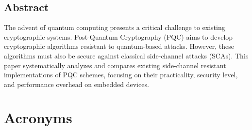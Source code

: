 \documentclass[a4paper,12pt,twoside,openany,headsepline,bibliography=totocnumbered]{scrbook}
\begin{document}


\section*{Abstract}
The advent of quantum computing presents a critical challenge to existing cryptographic systems. Post-Quantum Cryptography (PQC) aims to develop cryptographic algorithms resistant to quantum-based attacks. However, these algorithms must also be secure against classical side-channel attacks (SCAs). This paper systematically analyzes and compares existing side-channel resistant implementations of PQC schemes, focusing on their practicality, security level, and performance overhead on embedded devices.

\clearpage

\tableofcontents
\mainmatter

\chapter*{Acronyms}
\begin{acronym}
    \setlength{\itemsep}{0.2em}
\end{acronym}







\newpage
\listoffigures

\newpage
\listoftables
\clearpage

\backmatter



\end{document}
